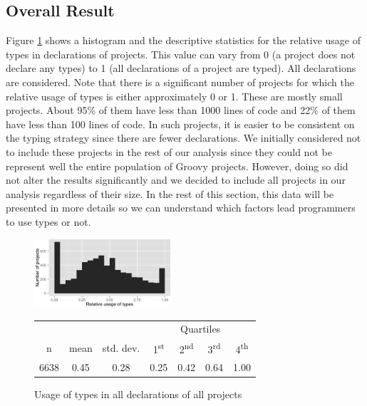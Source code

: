 \documentclass[preprint]{sigplanconf}
\newcommand{\ts}{\textsuperscript}
\begin{document}
\subsection{Overall Result\label{sec:results-overall}}
Figure \ref{fig:all_histogram_all} shows a histogram and the descriptive statistics for the relative usage of types in declarations of projects.
This value can vary from 0 (a project does not declare any types) to 1 (all declarations of a project are typed). 
All declarations are considered.
Note that there is a significant number of projects for which the relative usage of types is either approximately 0 or 1.
These are mostly small projects.
About 95\% of them have less than 1000 lines of code and 22\% of them have less than 100 lines of code.
In such projects, it is easier to be consistent on the typing strategy since there are fewer declarations.
We initially considered not to include these projects in the rest of our analysis since they could not be represent well the entire population of Groovy projects.
However, doing so did not alter the results significantly and we decided to include all projects in our analysis regardless of their size.
In the rest of this section, this data will be presented in more details so we can understand which factors lead programmers to use types or not.

\begin{figure}[h]
\centering 
\includegraphics[width=0.45\textwidth]{../analysis/result/all/histograms/5_all_types.png} 

\vspace{0.3cm}
\small
\begin{tabular}{|c|c|c|cccc|}
\hline
{}		&  {}		&  {}			&  \multicolumn{4}{c|}{Quartiles}				\\
n		& mean	& std. dev.	& 1\ts{st}	& 2\ts{nd}	& 3\ts{rd}	& 4\ts{th}		\\
\hline
\hline
6638 	& 0.45	& 0.28		& 0.25	& 0.42		& 0.64	& 1.00		\\
\hline
\end{tabular}


\caption{Usage of types in all declarations of all projects}
\label{fig:all_histogram_all} 
\end{figure}
\end{document}
